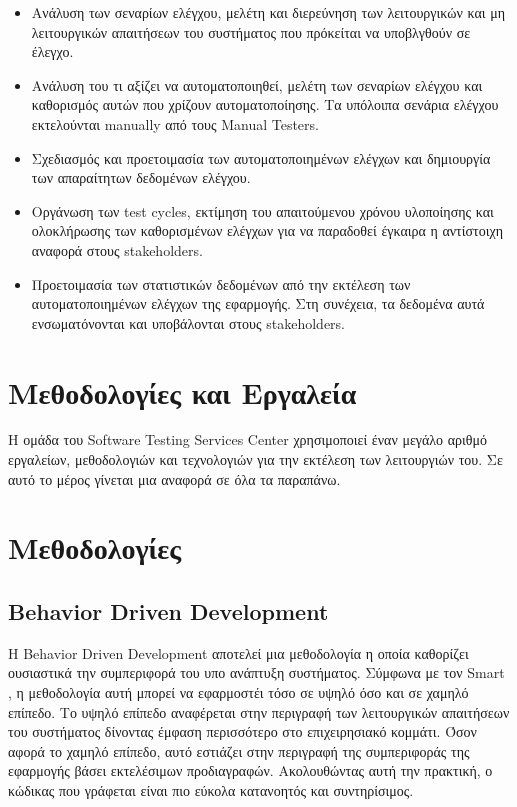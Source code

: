 \begin{itemize}
    \item Ανάλυση των σεναρίων ελέγχου, μελέτη και διερεύνηση των λειτουργικών και μη λειτουργικών απαιτήσεων του συστήματος που πρόκείται να υποβλγθούν σε έλεγχο.
    \item Ανάλυση του τι αξίζει να αυτοματοποιηθεί, μελέτη των σεναρίων ελέγχου και καθορισμός αυτών που χρίζουν αυτοματοποίησης. Τα υπόλοιπα σενάρια ελέγχου εκτελούνται manually από τους Manual Testers.
    \item Σχεδιασμός και προετοιμασία των αυτοματοποιημένων ελέγχων και δημιουργία των απαραίτητων δεδομένων ελέγχου.
    \item Οργάνωση των test cycles, εκτίμηση του απαιτούμενου χρόνου υλοποίησης και ολοκλήρωσης των καθορισμένων ελέγχων για να παραδοθεί έγκαιρα η αντίστοιχη αναφορά στους stakeholders.
    \item Προετοιμασία των στατιστικών δεδομένων από την εκτέλεση των αυτοματοποιημένων ελέγχων της εφαρμογής. Στη συνέχεια, τα δεδομένα αυτά ενσωματόνονται και υποβάλονται στους stakeholders.
\end{itemize}

\section*{Μεθοδολογίες και Εργαλεία}

Η ομάδα του Software Testing Services Center χρησιμοποιεί έναν μεγάλο αριθμό εργαλείων, μεθοδολογιών και τεχνολογιών για την εκτέλεση 
των λειτουργιών του. Σε αυτό το μέρος γίνεται μια αναφορά σε όλα τα παραπάνω.

\section*{Μεθοδολογίες}
\subsection*{Behavior Driven Development}
Η Behavior Driven Development αποτελεί μια μεθοδολογία η οποία καθορίζει ουσιαστικά την συμπεριφορά του υπο ανάπτυξη συστήματος. Σύμφωνα με 
τον Smart \cite{bddbook}, η μεθοδολογία αυτή μπορεί να εφαρμοστέι τόσο σε υψηλό όσο και σε χαμηλό επίπεδο. Το υψηλό επίπεδο αναφέρεται στην περιγραφή 
των λειτουργικών απαιτήσεων του συστήματος δίνοντας έμφαση περισσότερο στο επιχειρησιακό κομμάτι. Όσον αφορά το χαμηλό επίπεδο, αυτό εστιάζει 
στην περιγραφή της συμπεριφοράς της εφαρμογής βάσει εκτελέσιμων προδιαγραφών. Ακολουθώντας αυτή την πρακτική, ο κώδικας που γράφεται είναι πιο 
εύκολα κατανοητός και συντηρίσιμος. 

